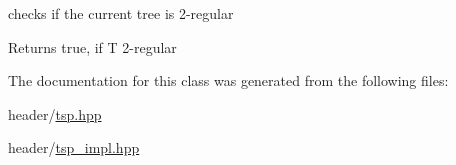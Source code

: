 checks if the current tree is 2-\/regular \begin{DoxyReturn}{Returns}
true, if T 2-\/regular 
\end{DoxyReturn}


The documentation for this class was generated from the following files\+:\begin{DoxyCompactItemize}
\item 
header/\hyperlink{tsp_8hpp}{tsp.\+hpp}\item 
header/\hyperlink{tsp__impl_8hpp}{tsp\+\_\+impl.\+hpp}\end{DoxyCompactItemize}
